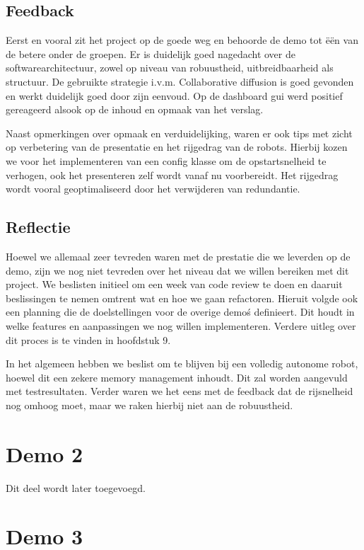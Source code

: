 \documentclass[12pt,a4paper]{report}
\begin{document}
\subsection{Feedback}

Eerst en vooral zit het project op de goede weg en behoorde de demo tot \"e\"en van de betere onder de groepen. Er is duidelijk goed nagedacht over de softwarearchitectuur, zowel op niveau van robuustheid, uitbreidbaarheid als structuur. De gebruikte strategie i.v.m. Collaborative diffusion is goed gevonden en werkt duidelijk goed door zijn eenvoud. Op de dashboard gui werd positief gereageerd alsook op de inhoud en opmaak van het verslag.

Naast opmerkingen over opmaak en verduidelijking, waren er ook tips met zicht op verbetering van de presentatie en het rijgedrag van de robots. Hierbij kozen we voor het implementeren van een config klasse om de opstartsnelheid te verhogen, ook het presenteren zelf wordt vanaf nu voorbereidt. Het rijgedrag wordt vooral geoptimaliseerd door het verwijderen van redundantie.

\subsection{Reflectie}

Hoewel we allemaal zeer tevreden waren met de prestatie die we leverden op de demo, zijn we nog niet tevreden over het niveau dat we willen bereiken met dit project.
We beslisten initieel om een week van code review te doen en daaruit beslissingen te nemen omtrent wat en hoe we gaan refactoren. Hieruit volgde ook een planning die de doelstellingen voor de overige demo\'s definieert. Dit houdt in welke features en aanpassingen we nog willen implementeren.
Verdere uitleg over dit proces is te vinden in hoofdstuk 9.

In het algemeen hebben we beslist om te blijven bij een volledig autonome robot, hoewel dit een zekere memory management inhoudt. Dit zal worden aangevuld met testresultaten. Verder waren we het eens met de feedback dat de rijsnelheid nog omhoog moet, maar we raken hierbij niet aan de robuustheid. 


\section{Demo 2}

Dit deel wordt later toegevoegd.

\section{Demo 3}
\end{document}
